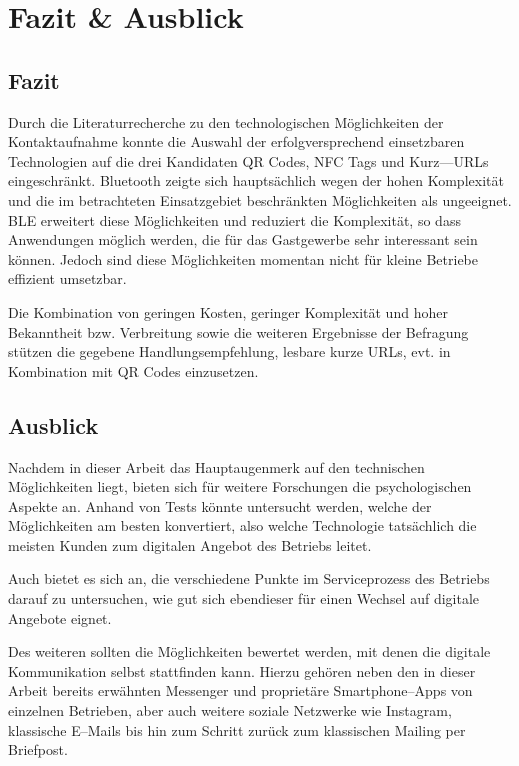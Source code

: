 \section{Fazit \& Ausblick}

\subsection{Fazit}

Durch die Literaturrecherche zu den technologischen Möglichkeiten der Kontaktaufnahme konnte die Auswahl der erfolgversprechend einsetzbaren Technologien auf die drei Kandidaten QR Codes, NFC Tags und Kurz—URLs eingeschränkt. Bluetooth zeigte sich hauptsächlich wegen der hohen Komplexität und die im betrachteten Einsatzgebiet beschränkten Möglichkeiten als ungeeignet. \ac{BLE} erweitert diese Möglichkeiten und reduziert die Komplexität, so dass Anwendungen möglich werden, die für das Gastgewerbe sehr interessant sein können. Jedoch sind diese Möglichkeiten momentan nicht für kleine Betriebe effizient umsetzbar.

Die Kombination von geringen Kosten, geringer Komplexität und hoher Bekanntheit bzw. Verbreitung sowie die weiteren Ergebnisse der Befragung stützen die gegebene Handlungsempfehlung, lesbare kurze \ac{URL}s, evt. in Kombination mit QR Codes einzusetzen.

\subsection{Ausblick}

Nachdem in dieser Arbeit das Hauptaugenmerk auf den technischen Möglichkeiten liegt, bieten sich für weitere Forschungen die psychologischen Aspekte an. Anhand von Tests könnte untersucht werden, welche der Möglichkeiten am besten konvertiert, also welche Technologie tatsächlich die meisten Kunden zum digitalen Angebot des Betriebs leitet.

Auch bietet es sich an, die verschiedene Punkte im Serviceprozess des Betriebs darauf zu untersuchen, wie gut sich ebendieser für einen Wechsel auf digitale Angebote eignet.

Des weiteren sollten die Möglichkeiten bewertet werden, mit denen die digitale Kommunikation selbst stattfinden kann. Hierzu gehören neben den in dieser Arbeit bereits erwähnten Messenger und proprietäre Smartphone–Apps von einzelnen Betrieben, aber auch weitere soziale Netzwerke wie Instagram, klassische E–Mails bis hin zum Schritt zurück zum klassischen Mailing per Briefpost. 


